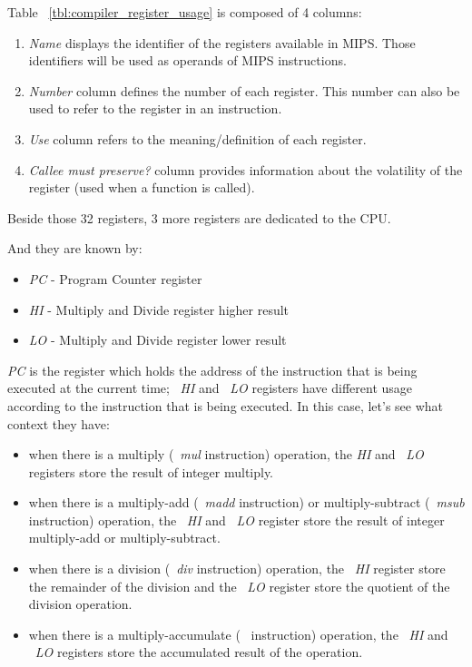 \documentclass[
  oneside,
  11pt, a4paper,
  footinclude=true,
  headinclude=true,
  cleardoublepage=empty
]{scrbook}
\begin{document}
Table ~\ref{tbl:compiler_register_usage} is composed of 4 columns:

\begin{enumerate}
\item \textit{Name} displays the identifier of the registers available in MIPS. Those identifiers will be used as operands of MIPS instructions.
\item \textit{Number} column defines the number of each register. This number can also be used to refer to the register in an instruction.
\item \textit{Use} column refers to the meaning/definition of each register.
\item \textit{Callee must preserve?} column  provides information about the volatility of the register (used when a function is called).

\end{enumerate}

Beside those 32 registers, 3 more registers are dedicated to the CPU.

And they are known by:

\begin{itemize}

\item \textit{PC} - Program Counter register
\item \textit{HI} - Multiply and Divide register higher result
\item \textit{LO} - Multiply and Divide register lower result

\end{itemize}


\textit{PC} is the register which holds the address of the instruction that is being executed at the current time; ~\textit{HI} and ~\textit{LO} registers have different usage according to the instruction that is being executed.
In this case, let's see what context they have:
\begin{itemize}
\item when there is a multiply (~\textit{mul} instruction) operation, the \textit{HI} and  ~\textit{LO}  registers store the result of integer multiply.
\item when there is a multiply-add (~\textit{madd} instruction) or multiply-subtract (~\textit{msub} instruction) operation, the ~\textit{HI} and ~\textit{LO} register store the result of integer multiply-add or multiply-subtract.
\item when there is a division (~\textit{div} instruction) operation, the ~\textit{HI} register store the remainder of the division and the ~\textit{LO} register store the quotient of the division operation.
\item when there is a multiply-accumulate (~\textit{} instruction) operation, the ~\textit{HI} and ~\textit{LO} registers store the accumulated result of the operation.
\end{itemize}
\end{document}
